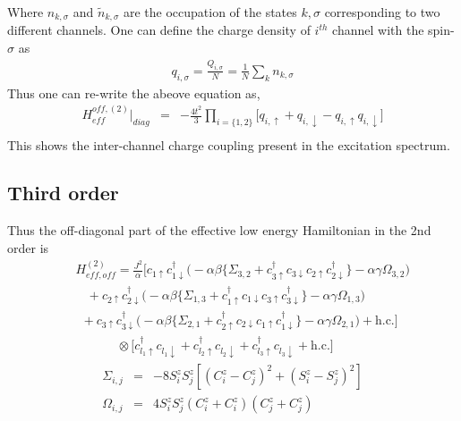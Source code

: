 \documentclass[reprint,prb,superscriptaddress]{revtex4-2}
\begin{document}
\noindent Where $n_{k,\sigma}$ and $\tilde{n}_{k,\sigma}$ are the occupation of the states $k,\sigma$ corresponding to two different channels. One can define the charge density of $i^{th}$ channel with the spin-$\sigma$ as 
\begin{eqnarray}
q_{i,\sigma}=\frac{Q_{i,\sigma}}{N}=\frac{1}{N}  \displaystyle\sum_{k} n_{k,\sigma}
\end{eqnarray}
Thus one can re-write the abeove equation as,
\begin{eqnarray}
H_{eff}^{off,(2)} \bigg|_{diag} &=& -\frac{4t^2}{3} \prod_{i=\{1,2\}} \bigg[q_{i,\uparrow}+q_{i,\downarrow}-q_{i,\uparrow}q_{i,\downarrow}\bigg] \nonumber\\
\end{eqnarray}
This shows the inter-channel charge coupling present in the excitation spectrum.


\subsection{Third order}


\noindent Thus the off-diagonal part of the effective low energy Hamiltonian in the 2nd order is
\begin{eqnarray}
&&H_{eff, off}^{(2)} 
= \frac{J^2}{\alpha}\bigg[ c_{1\uparrow}c_{1\downarrow}^{\dagger} \bigg(-\alpha\beta \bigg\{\Sigma_{3,2} + c_{3\uparrow}^{\dagger} c_{3\downarrow} c_{2\uparrow} c_{2\downarrow}^{\dagger} \bigg\}-\alpha\gamma \Omega_{3,2}\bigg) \nonumber\\
&&~~~~+c_{2\uparrow}c_{2\downarrow}^{\dagger} \bigg(-\alpha\beta \bigg\{\Sigma_{1,3} + c_{1\uparrow}^{\dagger} c_{1\downarrow} c_{3\uparrow} c_{3\downarrow}^{\dagger} \bigg\}-\alpha\gamma \Omega_{1,3}\bigg) \nonumber\\
&&~~+c_{3\uparrow}c_{3\downarrow}^{\dagger} \bigg(-\alpha\beta \bigg\{\Sigma_{2,1} + c_{2\uparrow}^{\dagger} c_{2\downarrow} c_{1\uparrow} c_{1\downarrow}^{\dagger} \bigg\}-\alpha\gamma \Omega_{2,1}\bigg) + \textrm{h.c.} \bigg]
\nonumber\\
&&~~~~~~~~~~~~~~~\otimes \bigg[ c_{l_1\uparrow}^{\dagger} c_{l_1\downarrow} +c_{l_2\uparrow}^{\dagger} c_{l_2\downarrow} + c_{l_3\uparrow}^{\dagger} c_{l_3\downarrow} + \textrm{h.c.}\bigg] \nonumber
\end{eqnarray} 
 \begin{eqnarray}
\Sigma_{i,j} &=&-8S_i^zS_j^z  [  (C^z_i-C^z_j  )^2  + (S_i^z-S_j^z  )^2  ] \\
\Omega_{i,j} &=& 4S_i^z S_j^z (C_i^z+C_i^z)(C_j^z+C_j^z)
\end{eqnarray}
\end{document}
